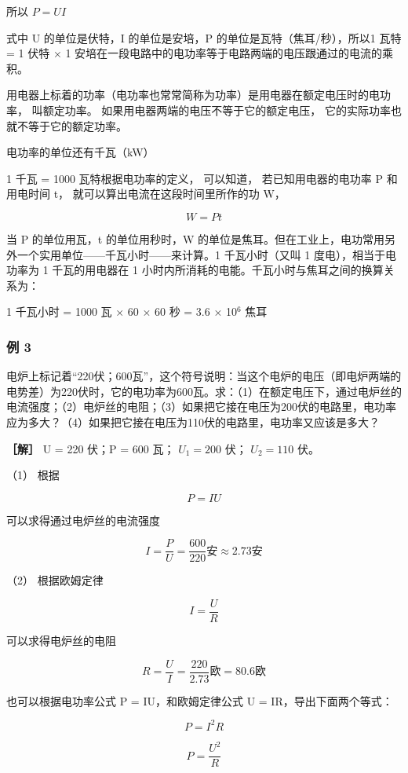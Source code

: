 所以 \(P = UI\)

式中 U 的单位是伏特，I 的单位是安培，P 的单位是瓦特（焦耳/秒），所以1
瓦特 = 1 伏特 × 1
安培在一段电路中的电功率等于电路两端的电压跟通过的电流的乘积。

用电器上标着的功率（电功率也常常简称为功率）是用电器在额定电压时的电功率，
叫额定功率。 如果用电器两端的电压不等于它的额定电压，
它的实际功率也就不等于它的额定功率。

电功率的单位还有千瓦（kW）

1 千瓦 = 1000 瓦特根据电功率的定义， 可以知道， 若已知用电器的电功率 P
和用电时间 t， 就可以算出电流在这段时间里所作的功 W，

\[
W = P t
\]

当 P 的单位用瓦，t 的单位用秒时，W
的单位是焦耳。但在工业上，电功常用另外一个实用单位------千瓦小时------来计算。1
千瓦小时（又叫 1 度电），相当于电功率为 1 千瓦的用电器在 1
小时内所消耗的电能。千瓦小时与焦耳之间的换算关系为：

1 千瓦小时 = 1000 瓦 × 60 × 60 秒 = 3.6 × 10\(^{6}\) 焦耳

\subsubsection{例 3}\label{ux4f8b-3-1}

电炉上标记着``220伏；600瓦''，这个符号说明：当这个电炉的电压（即电炉两端的电势差）为220伏时，它的电功率为600瓦。求：（1）在额定电压下，通过电炉丝的电流强度；（2）电炉丝的电阻；（3）如果把它接在电压为200伏的电路里，电功率应为多大？（4）如果把它接在电压为110伏的电路里，电功率又应该是多大？

\textbf{［解］} U = 220 伏；P = 600 瓦； \(U_{1} = 200\) 伏；
\(U_{2} = 110\) 伏。

（1） 根据

\[
P = I U
\]

可以求得通过电炉丝的电流强度

\[
I = \frac{P}{U} = \frac{600}{220} \text{安} \approx 2.73 \text{安}
\]

（2） 根据欧姆定律

\[
I = \frac{U}{R}
\]

可以求得电炉丝的电阻

\[
R=\frac{U}{I} = \frac{220}{2.73} \text{欧} = 80.6 \text{欧}
\]

也可以根据电功率公式 P = IU，和欧姆定律公式 U = IR，导出下面两个等式：

\[
P = I^{2} R
\]

\[
P = \frac{U^{2}}{R}
\]

